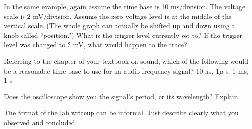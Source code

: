 \prelabquestion  In the same example, again assume the time base is 10
ms/division. The voltage scale is 2 mV/div\-ision. Assume
the zero voltage level is at the middle of the vertical
scale. (The whole graph can actually be shifted up and down
using a knob called ``position.'')  What is the trigger
level currently set to? If the trigger level was changed to
2 mV, what would happen to the trace?

\prelabquestion  Referring to the chapter of your textbook on sound,
which of the following would be a reasonable time base to
use for an audio-frequency signal? 10 ns, 1$\mu$ s, 1 ms, 1 s

\prelabquestion  Does the oscilloscope show you the signal's period,
or its wavelength? Explain.

\analysis

The format of the lab writeup can be informal. Just describe
clearly what you observed and concluded.

